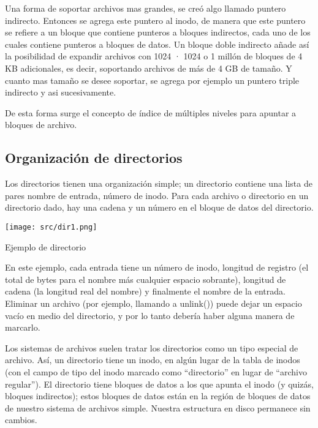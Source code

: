 \documentclass[openany]{book}
\begin{document}
Una forma de soportar archivos mas grandes, se creó algo llamado \colorbox{green!20}{puntero indirecto}. Entonces se agrega este puntero al inodo, de manera que este puntero se refiere a un bloque que contiene punteros a bloques indirectos, cada uno de los cuales \colorbox{green!20}{contiene punteros} a bloques de datos. Un bloque doble indirecto añade así la posibilidad de \colorbox{green!20}{expandir archivos} con 1024 · 1024 o 1 millón de bloques de 4 KB adicionales, es decir, soportando archivos de más de 4 GB de tamaño. Y cuanto mas tamaño se desee soportar, se agrega por ejemplo un puntero triple indirecto y asi sucesivamente.

De esta forma surge el concepto de \colorbox{green!20}{índice de múltiples niveles} para apuntar a bloques de archivo.

\subsection{Organización de directorios}

Los directorios tienen una organización simple; un directorio contiene una lista de pares \colorbox{green!20}{nombre de entrada}, \colorbox{green!20}{número de inodo}. Para cada archivo o directorio en un directorio dado, hay una cadena y un número en el bloque de datos del directorio. 

\begin{floatingfigure}[r]{0.6\textwidth}
    \texttt{[image: src/dir1.png]}
    \caption{Ejemplo de directorio}
\end{floatingfigure}

En este ejemplo, cada entrada tiene un número de inodo, longitud de registro (el total de bytes para el nombre más cualquier espacio sobrante), longitud de cadena (la longitud real del nombre) y finalmente el nombre de la entrada. Eliminar un archivo (por ejemplo, llamando a unlink()) puede dejar un espacio vacío en medio del directorio, y por lo tanto debería haber alguna manera de marcarlo.

Los sistemas de archivos suelen tratar los directorios como un tipo especial de archivo. Así, un directorio tiene un inodo, en algún lugar de la tabla de inodos (con el campo de tipo del inodo marcado como “directorio” en lugar de “archivo regular”). El directorio tiene bloques de datos a los que apunta el inodo (y quizás, bloques indirectos); estos bloques de datos están en la región de bloques de datos de nuestro sistema de archivos simple. Nuestra estructura en disco permanece sin cambios.
\end{document}
